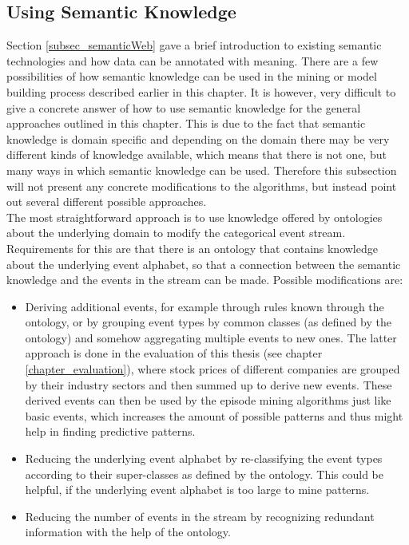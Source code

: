 \subsection{Using Semantic Knowledge}
\label{subsec_UsingSemantics}
Section \ref{subsec_semanticWeb} gave a brief introduction to existing semantic technologies and how data can be annotated with meaning. There are a few possibilities of how semantic knowledge can be used in the mining or model building process described earlier in this chapter. It is however, very difficult to give a concrete answer of how to use semantic knowledge for the general approaches outlined in this chapter. This is due to the fact that semantic knowledge is domain specific and depending on the domain there may be very different kinds of knowledge available, which means that there is not one, but many ways in which semantic knowledge can be used. Therefore this subsection will not present any concrete modifications to the algorithms, but instead point out several different possible approaches.\\
The most straightforward approach is to use knowledge offered by ontologies about the underlying domain to modify the categorical event stream. Requirements for this are that there is an ontology that contains knowledge about the underlying event alphabet, so that a connection between the semantic knowledge and the events in the stream can be made. Possible modifications are:

\begin{itemize}
	\item Deriving additional events, for example through rules known through the ontology, or by grouping event types by common classes (as defined by the ontology) and somehow aggregating multiple events to new ones. The latter approach is done in the evaluation of this thesis (see chapter \ref{chapter_evaluation}), where stock prices of different companies are grouped by their industry sectors and then summed up to derive new events. These derived events can then be used by the episode mining algorithms just like basic events, which increases the amount of possible patterns and thus might help in finding predictive patterns.
	\item Reducing the underlying event alphabet by re-classifying the event types according to their super-classes as defined by the ontology. This could be helpful, if the underlying event alphabet is too large to mine patterns.
	\item Reducing the number of events in the stream by recognizing redundant information with the help of the ontology.
\end{itemize}


